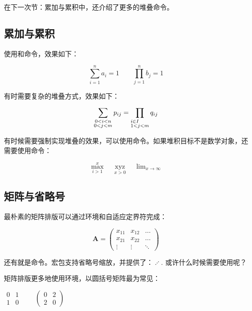 在下一次节：累加与累积中，还介绍了更多的堆叠命令。

\subsection{累加与累积}
使用和命令，效果如下：

\begin{codeshow}
\[\sum_{i=1}^{n}a_i=1 \qquad
\prod_{j=1}^{n}b_j=1\]
\end{codeshow}

有时需要复杂的堆叠方式，效果如下：

\begin{codeshow}
\[\sum_{\substack{0<i<n \\
  0<j<m}} p_{ij}=
  \prod_{\begin{subarray}{l}
  i\in I \\  1<j<m
  \end{subarray}}q_{ij}\]
\end{codeshow}

有时候需要强制实现堆叠的效果，可以使用命令。如果堆积目标不是数学对象，还需要使用命令：

\begin{codeshow}
\[\max\limits_{i>1}^{x}\quad
\mathop{xyz}\limits_{x>0}\quad
\lim\nolimits_{x\to \infty}\]
\end{codeshow}

\subsection{矩阵与省略号}
最朴素的矩阵排版可以通过环境和自适应定界符完成：

\begin{codeshow}
\[\mathbf{A}=
\left(\begin{array}{ccc}
x_{11} & x_{12} & \ldots \\
x_{21} & x_{22} & \ldots \\
\vdots & \vdots & \ddots
\end{array}\right)\]
\end{codeshow}

还有就是命令。宏包支持省略号缩放，并提供了：$\iddots$. 或许什么时候需要使用呢？

矩阵排版更多地使用环境，以圆括号矩阵最为常见：
\begin{codeshow}
\centering $\begin{matrix}
0 & 1 \\ 1 & 0 \end{matrix}\qquad
\begin{pmatrix} 0 & 2 \\
2 & 0 \end{pmatrix}$
\end{codeshow}

